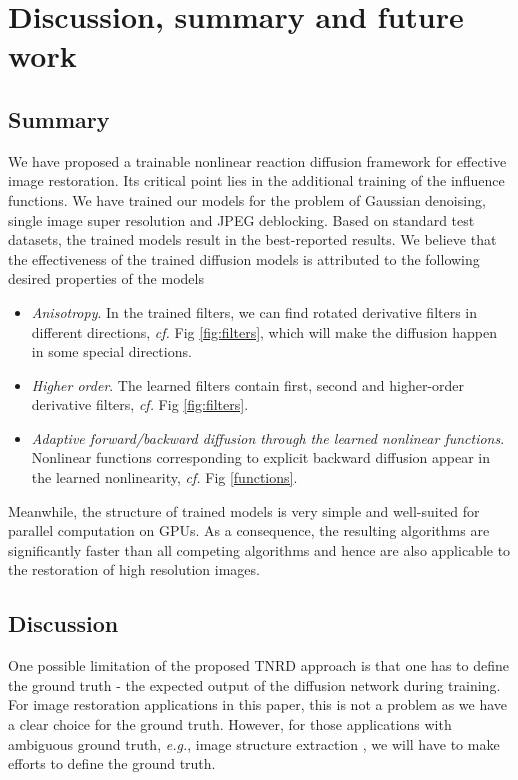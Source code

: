 \documentclass[10pt,journal,compsoc]{IEEEtran}
\newcommand{\eg}{\emph{e.g.}}
\begin{document}
\section{Discussion, summary and future work}
\subsection{Summary}
We have proposed a trainable nonlinear reaction diffusion framework for effective image restoration. Its critical point lies in 
the additional training of the influence functions. We have trained our models for 
the problem of Gaussian denoising, single image super resolution and JPEG deblocking. Based on standard test datasets, 
the trained models result in the best-reported results. 
We believe that the effectiveness of the trained diffusion models is attributed to the following desired properties of the models
\begin{itemize}
\setlength\itemsep{0em}
    \item \noindent \textit{Anisotropy}. In the trained filters, we can find rotated derivative filters in different directions, \textit{cf.} Fig 
\ref{fig:filters}, which will make the diffusion happen in some special directions. 
    \item \textit{Higher order}. The learned filters contain first, second and higher-order derivative filters, \textit{cf.} Fig 
\ref{fig:filters}.  
    \item \textit{Adaptive forward/backward diffusion through the learned nonlinear functions}. Nonlinear functions corresponding to 
explicit backward diffusion appear in the learned nonlinearity, \textit{cf.} Fig \ref{functions}.
\end{itemize}

Meanwhile, the structure of trained models is very simple 
and well-suited for parallel computation on GPUs. As a consequence, 
the resulting algorithms are significantly faster than all competing algorithms and hence are also applicable to the restoration 
of high resolution images. 

\subsection{Discussion}
One possible limitation of the proposed TNRD approach is that one has to define the ground truth - the expected output of the diffusion network during training. 
For image restoration applications in this paper, this is not a problem as we have a clear choice for the ground truth. 
However, for those applications with ambiguous ground truth, \eg, image structure extraction \cite{xu2012structure}, 
we will have to make efforts to define the ground truth.
\end{document}
